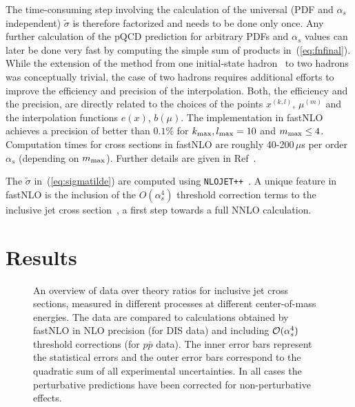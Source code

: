 %
The time-consuming step involving the calculation of the universal
(PDF and $\alpha_s$ independent) $\tilde\sigma$
is therefore factorized and needs to be done only once.
Any further calculation of the pQCD prediction
for arbitrary PDFs and $\alpha_s$ values can later
be done very fast by computing the simple sum of products
in~(\ref{eq:fnfinal}).
%
While the extension of the method from one 
initial-state hadron~\cite{Wobisch:2000dk}
to two hadrons was conceptually trivial, the case of two hadrons
requires additional efforts to improve the efficiency
and precision of the interpolation.
Both, the efficiency and the precision, are directly related to the 
choices of the points 
$x^{(k,l)}$, $\mu^{(m)}$ and the 
interpolation functions $e(x)$, $b(\mu)$.
The implementation in 
fastNLO achieves a precision of better than $0.1\%$ 
for $k_{\rm max},l_{\rm max} =10$ and $m_{\rm max}\le 4$.
%
Computation times for cross sections in fastNLO are roughly 
40-200\,$\mu$s per order $\alpha_s$ (depending on 
$m_{\rm max}$).
Further details are given in Ref~\cite{fastnlo}.


The $\tilde{\sigma}$ in~(\ref{eq:sigmatilde}) are computed using 
{\tt NLOJET++}~\cite{Nagy:2003tz,Nagy:2001fj}.
A unique feature in fastNLO is the inclusion of the $O(\alpha_s^4)$
threshold correction terms to the 
inclusive jet cross section~\cite{Kidonakis:2000gi},
a first step towards a full NNLO calculation.





\section{Results}

\begin{figure}[!h]
\centerline{
}
  \caption{An overview of data over theory ratios for 
  inclusive jet cross sections, measured 
  in different processes at different center-of-mass energies.
  The data are compared to calculations obtained by fastNLO
  in NLO precision (for DIS data) and including 
  ${\cal O}(\alpha_s^4)$ threshold  corrections (for $p\bar{p}$ data).
  The inner error bars represent the statistical errors and the
  outer error bars correspond to the quadratic sum of all 
  experimental uncertainties.
  In all cases the perturbative predictions have been 
  corrected for non-perturbative effects.
  \label{fig:fnresults}}
\end{figure}

